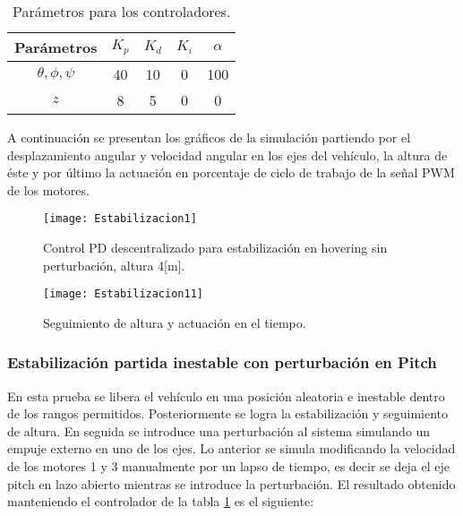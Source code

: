 \documentclass[\main/main.tex]{subfiles}
\begin{document}
\begin{table}[H]
\noindent \begin{centering}
\begin{tabular}{|c|c|c|c|c|}
\hline 
Parámetros & $K_{p}$ & $K_{d}$ & $K_{i}$ & $\alpha$\tabularnewline
\hline 
\hline 
$\theta,\phi,\psi$ & 40 & 10 & 0 & 100\tabularnewline
\hline 
$z$ & 8 & 5 & 0 & 0\tabularnewline
\hline 
\end{tabular}
\par\end{centering}
\caption{Parámetros para los controladores.\label{tab:kp kd ki alpha}}
\end{table}

A continuación se presentan los gráficos de la simulación partiendo por el desplazamiento angular y velocidad angular en los ejes del vehículo, la altura de éste y por último la actuación en porcentaje de ciclo de trabajo de la señal PWM de los motores.

\begin{figure}[H]
\noindent \begin{centering}
\texttt{[image: Estabilizacion1]}
\par\end{centering}
\caption{Control PD descentralizado para estabilización en hovering sin perturbación,
altura 4{[}m{]}.}
\end{figure}

\begin{figure}[H]
\noindent \begin{centering}
\texttt{[image: Estabilizacion11]}
\par\end{centering}
\caption{Seguimiento de altura y actuación en el tiempo.}
\end{figure}

\subsubsection{Estabilización partida inestable con perturbación en Pitch}

En esta prueba se libera el vehículo en una posición aleatoria e inestable
dentro de los rangos permitidos. Posteriormente se logra la estabilización
y seguimiento de altura. En seguida se introduce una perturbación
al sistema simulando un empuje externo en uno de los ejes. Lo anterior
se simula modificando la velocidad de los motores 1 y 3 manualmente
por un lapso de tiempo, es decir se deja el eje pitch en lazo abierto
mientras se introduce la perturbación. El resultado obtenido manteniendo
el controlador de la tabla \ref{tab:kp kd ki alpha} es el siguiente:
\end{document}
